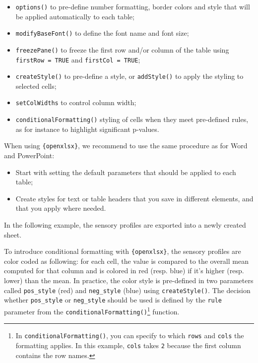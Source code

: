\documentclass[
]{book}
\providecommand{\tightlist}{%
  \setlength{\itemsep}{0pt}\setlength{\parskip}{0pt}}
\begin{document}
\begin{itemize}
  \begin{itemize}
  \tightlist
  \item
    \texttt{options()} to pre-define number formatting, border colors and style that will be applied automatically to each table;
  \item
    \texttt{modifyBaseFont()} to define the font name and font size;
  \item
    \texttt{freezePane()} to freeze the first row and/or column of the table using \texttt{firstRow\ =\ TRUE} and \texttt{firstCol\ =\ TRUE};
  \item
    \texttt{createStyle()} to pre-define a style, or \texttt{addStyle()} to apply the styling to selected cells;
  \item
    \texttt{setColWidths} to control column width;
  \item
    \texttt{conditionalFormatting()} styling of cells when they meet pre-defined rules, as for instance to highlight significant p-values.
  \end{itemize}
\end{itemize}

When using \texttt{\{openxlsx\}}, we recommend to use the same procedure as for Word and PowerPoint:

\begin{itemize}
\tightlist
\item
  Start with setting the default parameters that should be applied to each table;
\item
  Create styles for text or table headers that you save in different elements, and that you apply where needed.
\end{itemize}

In the following example, the sensory profiles are exported into a newly created sheet.

To introduce conditional formatting with \texttt{\{openxlsx\}}, the sensory profiles are color coded as following: for each cell, the value is compared to the overall mean computed for that column and is colored in red (resp. blue) if it's higher (resp. lower) than the mean.
In practice, the color style is pre-defined in two parameters called \texttt{pos\_style} (red) and \texttt{neg\_style} (blue) using \texttt{createStyle()}. The decision whether \texttt{pos\_style} or \texttt{neg\_style} should be used is defined by the \texttt{rule} parameter from the \texttt{conditionalFormatting()}\footnote{In \texttt{conditionalFormatting()}, you can specify to which \texttt{rows} and \texttt{cols} the formatting applies. In this example, \texttt{cols} takes \texttt{2} because the first column contains the row names.} function.
\end{document}
